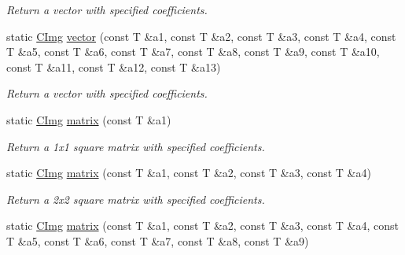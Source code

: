 \begin{DoxyCompactItemize}
\begin{DoxyCompactList}\small\item\em Return a vector with specified coefficients. \item\end{DoxyCompactList}\item 
\hypertarget{structcimg__library_1_1_c_img_af3160060e9e72a221697c3509eec49c3}{
static \hyperlink{structcimg__library_1_1_c_img}{CImg} \hyperlink{structcimg__library_1_1_c_img_af3160060e9e72a221697c3509eec49c3}{vector} (const T \&a1, const T \&a2, const T \&a3, const T \&a4, const T \&a5, const T \&a6, const T \&a7, const T \&a8, const T \&a9, const T \&a10, const T \&a11, const T \&a12, const T \&a13)}
\label{structcimg__library_1_1_c_img_af3160060e9e72a221697c3509eec49c3}

\begin{DoxyCompactList}\small\item\em Return a vector with specified coefficients. \item\end{DoxyCompactList}\item 
\hypertarget{structcimg__library_1_1_c_img_ae4af6d0e51d20cfb3db1c9e971b33874}{
static \hyperlink{structcimg__library_1_1_c_img}{CImg} \hyperlink{structcimg__library_1_1_c_img_ae4af6d0e51d20cfb3db1c9e971b33874}{matrix} (const T \&a1)}
\label{structcimg__library_1_1_c_img_ae4af6d0e51d20cfb3db1c9e971b33874}

\begin{DoxyCompactList}\small\item\em Return a 1x1 square matrix with specified coefficients. \item\end{DoxyCompactList}\item 
\hypertarget{structcimg__library_1_1_c_img_af7691093141c8dbeb53d3504acb51818}{
static \hyperlink{structcimg__library_1_1_c_img}{CImg} \hyperlink{structcimg__library_1_1_c_img_af7691093141c8dbeb53d3504acb51818}{matrix} (const T \&a1, const T \&a2, const T \&a3, const T \&a4)}
\label{structcimg__library_1_1_c_img_af7691093141c8dbeb53d3504acb51818}

\begin{DoxyCompactList}\small\item\em Return a 2x2 square matrix with specified coefficients. \item\end{DoxyCompactList}\item 
\hypertarget{structcimg__library_1_1_c_img_a9b23a94b4944af63a49ff016340f1fe3}{
static \hyperlink{structcimg__library_1_1_c_img}{CImg} \hyperlink{structcimg__library_1_1_c_img_a9b23a94b4944af63a49ff016340f1fe3}{matrix} (const T \&a1, const T \&a2, const T \&a3, const T \&a4, const T \&a5, const T \&a6, const T \&a7, const T \&a8, const T \&a9)}
\label{structcimg__library_1_1_c_img_a9b23a94b4944af63a49ff016340f1fe3}


\end{DoxyCompactItemize}
